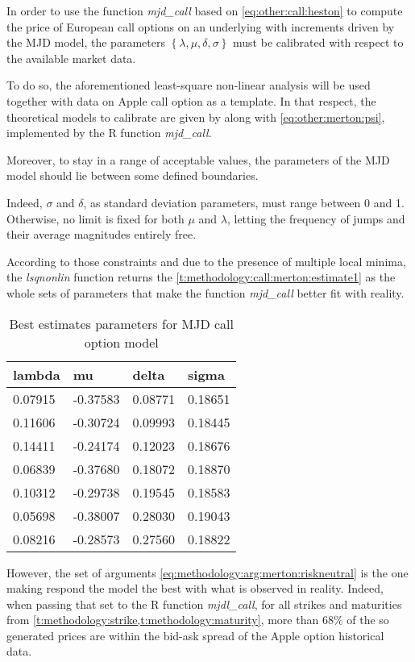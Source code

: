 \documentclass[12pt]{report}
\begin{document}
In order to use the function \textit{mjd\_call} based on \cref{eq:other:call:heston} to compute the price of European call options on an underlying with increments driven by the MJD model, the parameters $\left\{ \lambda, \mu, \delta ,\sigma \right\}$ must be calibrated with respect to the available market data.

To do so, the aforementioned least-square non-linear analysis will be used together with data on Apple call option as a template.
In that respect, the theoretical models to calibrate are given by  along with \cref{eq:other:merton:psi}, implemented by the R function \textit{mjd\_call}.

Moreover, to stay in a range of acceptable values, the parameters of the MJD model should lie between some defined boundaries. 

Indeed, $\sigma$ and $\delta$, as standard deviation parameters, must range between 0 and 1. 
Otherwise, no limit is fixed for both $\mu$ and $\lambda$, letting the frequency of jumps and their average magnitudes entirely free.

According to those constraints and due to the presence of multiple local minima, the \textit{lsqnonlin} function returns the \cref{t:methodology:call:merton:estimate1} as the whole sets of parameters that make the function \textit{mjd\_call} better fit with reality.

\begin{table}[h]
\centering
\begin{tabular}{llll}
  \hline
lambda & mu & delta & sigma \\ 
  \hline
0.07915 & -0.37583 & 0.08771 & 0.18651 \\ 
  0.11606 & -0.30724 & 0.09993 & 0.18445 \\ 
  0.14411 & -0.24174 & 0.12023 & 0.18676 \\ 
  0.06839 & -0.37680 & 0.18072 & 0.18870 \\ 
  0.10312 & -0.29738 & 0.19545 & 0.18583 \\ 
  0.05698 & -0.38007 & 0.28030 & 0.19043 \\ 
  0.08216 & -0.28573 & 0.27560 & 0.18822 \\ 
   \hline
\end{tabular}
\caption{Best estimates parameters for MJD call option model} 
\end{table}

However, the set of arguments \ref{eq:methodology:arg:merton:riskneutral} is the one making respond the model the best with what is observed in reality.
Indeed, when passing that set to the R function \textit{mjdl\_call}, for all strikes and maturities from \cref{t:methodology:strike,t:methodology:maturity}, more than $68\%$ of the so generated prices are within the bid-ask spread of the Apple option historical data.
\end{document}
